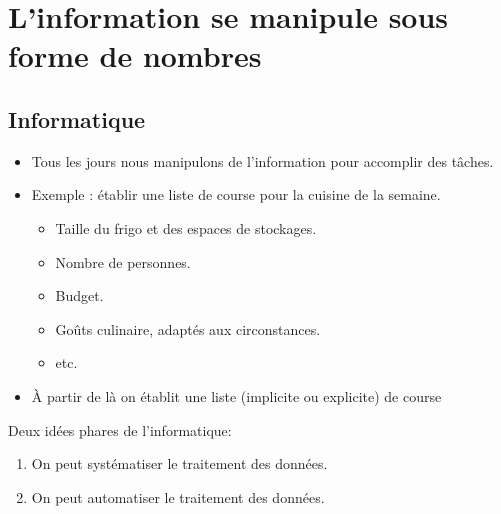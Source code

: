 \section[L'information se manipule]{L'information se manipule sous forme de nombres}

\subsection{Informatique}

\begin{slide}
	\begin{itemize}
	\item Tous les jours nous manipulons de l'information pour accomplir des tâches.
	\item Exemple : établir une liste de course pour la cuisine de la semaine.
		
		\begin{itemize}
			\item Taille du frigo et des espaces de stockages.
			\item Nombre de personnes.
			\item Budget.
			\item Goûts culinaire, adaptés aux circonstances.
			\item etc.
		\end{itemize}
	\item À partir de là on établit une liste (implicite ou explicite) de course
	
	\end{itemize}
\end{slide}

\begin{slide}

Deux idées phares de l'informatique:
	\begin{enumerate}
		\item On peut systématiser le traitement des données.
		\item On peut automatiser le traitement des données.
	\end{enumerate}
\end{slide}

